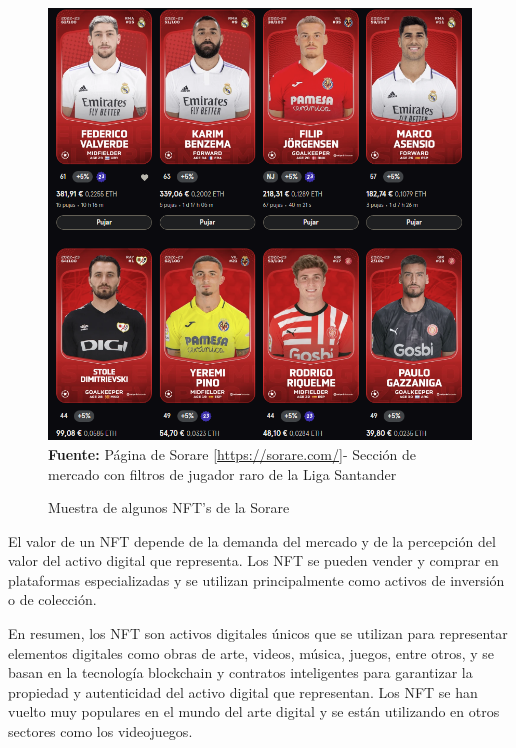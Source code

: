 \begin{figure}[htb!]
    \caption{Muestra de algunos NFT's de la Sorare}
    \label{fig:sorare-nft}
    \centering
    \includegraphics[scale=0.5]{./Ilustraciones/sorare-nft.png}\\
    \textbf{Fuente:} Página de Sorare [\url{https://sorare.com/}]- Sección de mercado con 
    filtros de jugador raro de la Liga Santander
\end{figure}

El valor de un NFT depende de la demanda del mercado y de la percepción del 
valor del activo digital que representa. Los NFT se pueden vender y comprar 
en plataformas especializadas y se utilizan principalmente como activos de 
inversión o de colección.

En resumen, los NFT son activos digitales únicos que se utilizan para 
representar elementos digitales como obras de arte, videos, música, juegos, 
entre otros, y se basan en la tecnología blockchain y contratos inteligentes 
para garantizar la propiedad y autenticidad del activo digital que representan. 
Los NFT se han vuelto muy populares en el mundo del arte digital y se están 
utilizando en otros sectores como los videojuegos\cite{xatakaNFT}.